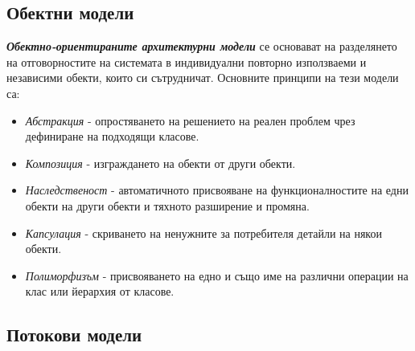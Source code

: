 \documentclass[fleqn,12pt]{article}
\begin{document}
\subsection{Обектни модели}

\textbf{\textit{Обектно-ориентираните архитектурни модели}} се основават на разделянето на отговорностите на системата в индивидуални повторно използваеми и независими обекти, които си сътрудничат.
Основните принципи на тези модели са:
\begin{itemize}
    \item \textit{Абстракция} - опростяването на решението на реален проблем чрез дефиниране на подходящи класове.
    \item \textit{Композиция} - изграждането на обекти от други обекти.
    \item \textit{Наследственост} - автоматичното присвояване на функционалностите на едни обекти на други обекти и тяхното разширение и промяна.
    \item \textit{Капсулация} - скриването на ненужните за потребителя детайли на някои обекти.
    \item \textit{Полиморфизъм} - присвояването на едно и също име на различни операции на клас или йерархия от класове.
\end{itemize}

\subsection{Потокови модели}
\end{document}
